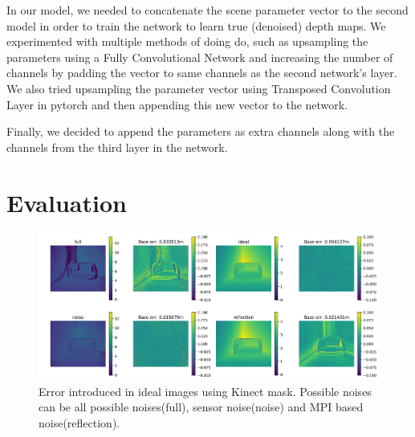 \documentclass[runningheads]{llncs}
\begin{document}
In our model, we needed to concatenate the scene parameter vector to the second model in order to train the network to learn true (denoised) depth maps. We experimented with multiple methods of doing do, such as upsampling the parameters using a Fully Convolutional Network and increasing the number of channels by padding the vector to same channels as the second network's layer. We also tried upsampling the parameter vector using Transposed Convolution Layer in pytorch and then appending this new vector to the network.

Finally, we decided to append the parameters as extra channels along with the channels from the third layer in the network. 

\section{Evaluation}

\begin{figure}
    \centering
    \includegraphics[scale=0.35]{img/depthmap/error.png}
    \caption{Error introduced in ideal images using Kinect mask. Possible noises can be all possible noises(full), sensor noise(noise) and MPI based noise(reflection). }
    \label{fig:result_raw}
\end{figure}
\end{document}
